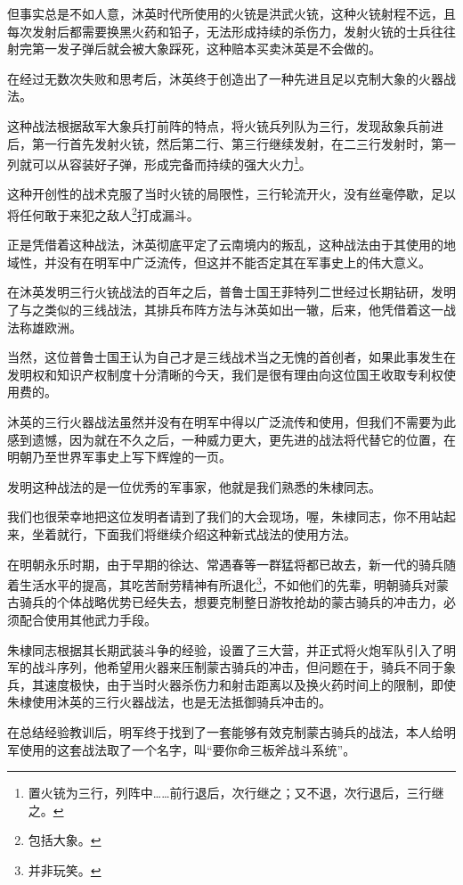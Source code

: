 \begin{multicols}{\theparacolNo}
但事实总是不如人意，沐英时代所使用的火铳是洪武火铳，这种火铳射程不远，且每次发射后都需要换黑火药和铅子，无法形成持续的杀伤力，发射火铳的士兵往往射完第一发子弹后就会被大象踩死，这种赔本买卖沐英是不会做的。

在经过无数次失败和思考后，沐英终于创造出了一种先进且足以克制大象的火器战法。

这种战法根据敌军大象兵打前阵的特点，将火铳兵列队为三行，发现敌象兵前进后，第一行首先发射火铳，然后第二行、第三行继续发射，在二三行发射时，第一列就可以从容装好子弹，形成完备而持续的强大火力\footnote{置火铳为三行，列阵中……前行退后，次行继之；又不退，次行退后，三行继之。}。

这种开创性的战术克服了当时火铳的局限性，三行轮流开火，没有丝毫停歇，足以将任何敢于来犯之敌人\footnote{包括大象。}打成漏斗。

正是凭借着这种战法，沐英彻底平定了云南境内的叛乱，这种战法由于其使用的地域性，并没有在明军中广泛流传，但这并不能否定其在军事史上的伟大意义。

在沐英发明三行火铳战法的百年之后，普鲁士国王菲特列二世经过长期钻研，发明了与之类似的三线战法，其排兵布阵方法与沐英如出一辙，后来，他凭借着这一战法称雄欧洲。

当然，这位普鲁士国王认为自己才是三线战术当之无愧的首创者，如果此事发生在发明权和知识产权制度十分清晰的今天，我们是很有理由向这位国王收取专利权使用费的。

沐英的三行火器战法虽然并没有在明军中得以广泛流传和使用，但我们不需要为此感到遗憾，因为就在不久之后，一种威力更大，更先进的战法将代替它的位置，在明朝乃至世界军事史上写下辉煌的一页。

发明这种战法的是一位优秀的军事家，他就是我们熟悉的朱棣同志。

我们也很荣幸地把这位发明者请到了我们的大会现场，喔，朱棣同志，你不用站起来，坐着就行，下面我们将继续介绍这种新式战法的使用方法。

在明朝永乐时期，由于早期的徐达、常遇春等一群猛将都已故去，新一代的骑兵随着生活水平的提高，其吃苦耐劳精神有所退化\footnote{并非玩笑。}，不如他们的先辈，明朝骑兵对蒙古骑兵的个体战略优势已经失去，想要克制整日游牧抢劫的蒙古骑兵的冲击力，必须配合使用其他武力手段。

朱棣同志根据其长期武装斗争的经验，设置了三大营，并正式将火炮军队引入了明军的战斗序列，他希望用火器来压制蒙古骑兵的冲击，但问题在于，骑兵不同于象兵，其速度极快，由于当时火器杀伤力和射击距离以及换火药时间上的限制，即使朱棣使用沐英的三行火器战法，也是无法抵御骑兵冲击的。

在总结经验教训后，明军终于找到了一套能够有效克制蒙古骑兵的战法，本人给明军使用的这套战法取了一个名字，叫“要你命三板斧战斗系统”。


\end{multicols}
